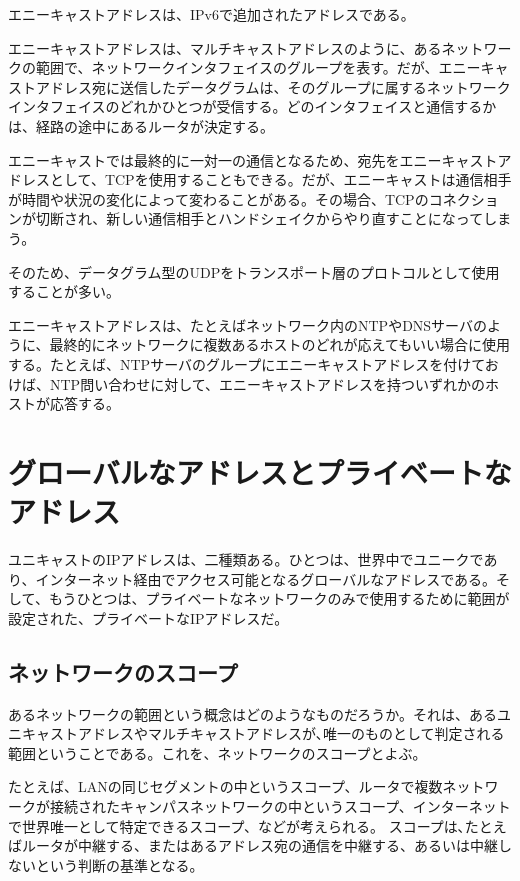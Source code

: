 エニーキャストアドレスは、IPv6で追加されたアドレスである。

エニーキャストアドレスは、マルチキャストアドレスのように、あるネットワークの範囲で、ネットワークインタフェイスのグループを表す。だが、エニーキャストアドレス宛に送信したデータグラムは、そのグループに属するネットワークインタフェイスのどれかひとつが受信する。どのインタフェイスと通信するかは、経路の途中にあるルータが決定する。

エニーキャストでは最終的に一対一の通信となるため、宛先をエニーキャストアドレスとして、TCPを使用することもできる。だが、エニーキャストは通信相手が時間や状況の変化によって変わることがある。その場合、TCPのコネクションが切断され、新しい通信相手とハンドシェイクからやり直すことになってしまう。

そのため、データグラム型のUDPをトランスポート層のプロトコルとして使用することが多い。

エニーキャストアドレスは、たとえばネットワーク内のNTPやDNSサーバのように、最終的にネットワークに複数あるホストのどれが応えてもいい場合に使用する。たとえば、NTPサーバのグループにエニーキャストアドレスを付けておけば、NTP問い合わせに対して、エニーキャストアドレスを持ついずれかのホストが応答する。

\section{グローバルなアドレスとプライベートなアドレス}

ユニキャストのIPアドレスは、二種類ある。ひとつは、世界中でユニークであり、インターネット経由でアクセス可能となるグローバルなアドレスである。そして、もうひとつは、プライベートなネットワークのみで使用するために範囲が設定された、プライベートなIPアドレスだ。

\subsection{ネットワークのスコープ}
あるネットワークの範囲という概念はどのようなものだろうか。それは、あるユニキャストアドレスやマルチキャストアドレスが､唯一のものとして判定される範囲ということである。これを、ネットワークのスコープとよぶ。

たとえば、LANの同じセグメントの中というスコープ、ルータで複数ネットワークが接続されたキャンパスネットワークの中というスコープ、インターネットで世界唯一として特定できるスコープ、などが考えられる。
スコープは､たとえばルータが中継する、またはあるアドレス宛の通信を中継する、あるいは中継しないという判断の基準となる。

